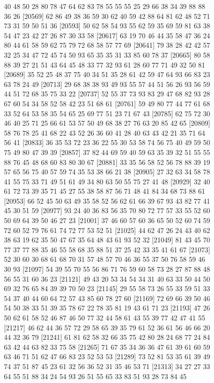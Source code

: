 \documentclass{article}
\begin{document}
\begin{figure}[H]
\begin{Schunk}
\begin{Soutput}
[20545] 40 48 50 28 80 78 47 64 62 83 78 55 55 55 25 29 66 38 34 39 88 88 36 26
[20569] 62 86 49 38 36 59 30 62 40 59 42 88 64 81 62 48 52 71 73 31 59 50 51 36
[20593] 50 62 58 54 93 55 62 59 35 69 59 81 63 38 54 47 23 42 27 26 87 30 33 58
[20617] 63 19 70 46 44 35 58 47 36 24 80 44 61 58 59 62 75 79 72 68 58 57 77 69
[20641] 79 38 28 42 42 57 32 25 34 47 72 45 74 50 93 65 35 35 31 33 85 60 78 37
[20665] 80 58 88 39 27 21 51 43 64 45 48 33 77 32 93 61 28 60 77 71 49 32 50 81
[20689] 35 52 25 48 37 75 40 34 51 35 28 61 42 59 47 64 93 66 83 23 63 78 24 49
[20713] 29 68 38 38 93 49 93 55 57 44 51 56 26 93 56 59 44 51 72 68 35 75 33 22
[20737] 52 55 37 73 93 83 29 47 68 82 93 28 67 60 54 34 58 52 58 42 23 51 68 61
[20761] 59 49 80 77 44 77 61 68 33 52 64 53 58 35 54 65 25 69 77 51 23 71 67 43
[20785] 62 75 72 30 46 40 25 71 25 66 61 53 57 50 49 68 38 27 76 63 20 85 42 65
[20809] 58 76 78 25 41 68 22 43 52 26 36 60 41 28 40 63 43 42 21 35 71 64 56 41
[20833] 36 35 53 72 23 36 22 55 30 53 58 74 56 75 40 49 59 50 75 49 80 47 39 39
[20857] 37 82 44 69 59 40 59 63 35 39 32 51 55 55 88 76 45 48 68 60 83 80 30 67
[20881] 33 35 56 58 52 56 78 88 39 19 57 65 56 75 40 57 59 74 35 53 38 66 21 38
[20905] 27 32 63 34 58 78 41 55 75 33 71 49 51 61 49 34 80 63 50 55 75 27 41 48
[20929] 32 40 61 72 73 39 35 71 45 27 55 38 58 87 56 71 48 41 84 34 68 73 88 61
[20953] 66 52 45 50 63 49 35 58 52 56 62 61 66 39 67 93 43 82 77 41 45 30 51 59
[20977] 93 24 40 36 83 56 35 70 80 72 77 57 33 55 52 60 50 69 64 39 50 46 27 23
[21001] 37 46 60 57 60 36 65 50 52 60 74 59 72 60 52 79 76 61 74 72 77 53 52 51
[21025] 44 62 47 26 24 43 40 62 38 63 19 62 35 50 47 67 35 64 48 43 61 93 52 32
[21049] 81 43 45 70 77 37 77 88 35 46 55 58 68 35 88 51 37 25 42 33 35 41 61 67
[21073] 52 30 60 30 68 61 68 70 31 57 48 57 70 46 36 55 37 50 76 58 59 46 30 93
[21097] 54 39 55 70 55 56 86 71 76 59 60 58 73 28 27 87 88 48 56 55 31 60 36 23
[21121] 49 43 20 53 34 54 34 31 40 63 33 50 44 50 69 32 76 65 84 39 39 70 50 23
[21145] 29 55 58 73 26 55 33 59 51 33 54 37 40 44 60 64 72 57 43 85 60 78 27 60
[21169] 72 69 66 39 50 46 54 50 38 33 51 39 35 78 67 22 78 35 81 19 43 61 71 23
[21193] 47 26 50 62 61 58 52 46 87 46 50 77 32 44 58 61 43 55 39 77 42 47 41 55
[21217] 46 62 44 36 57 72 29 58 65 39 35 79 61 52 36 61 56 46 66 20 44 32 36 79
[21241] 61 81 62 58 32 66 35 75 42 80 28 24 68 77 24 84 63 42 44 63 82 33 75 58
[21265] 71 67 35 34 36 36 47 61 39 61 60 59 63 46 71 51 62 47 66 83 23 52 53 53
[21289] 73 52 81 53 35 61 39 49 74 37 51 87 45 23 61 32 56 36 52 31 35 46 53 71
[21313] 34 27 27 33 64 55 51 88 34 24 54 93 26 51 55 65 33 83 51 93 28 73 84 45

\end{Soutput}
\end{Schunk}
\end{figure}
\end{document}
